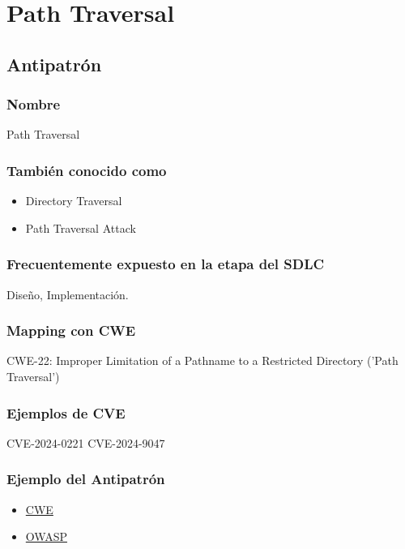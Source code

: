 \chapter{Path Traversal}

\section{Antipatrón}

\subsection*{Nombre}
Path Traversal

\subsection*{También conocido como}
\begin{itemize}
    \item Directory Traversal
    \item Path Traversal Attack
\end{itemize}

\subsection*{Frecuentemente expuesto en la etapa del SDLC}

Diseño, Implementación.

\subsection*{Mapping con CWE}
CWE-22: Improper Limitation of a Pathname to a Restricted Directory ('Path Traversal')

\subsection*{Ejemplos de CVE}
CVE-2024-0221
CVE-2024-9047

\subsection*{Ejemplo del Antipatrón}

\begin{itemize}
    \item \href{https://cwe.mitre.org/data/definitions/22.html}{CWE}
    \item \href{https://owasp.org/www-community/attacks/Path_Traversal}{OWASP}
\end{itemize}

